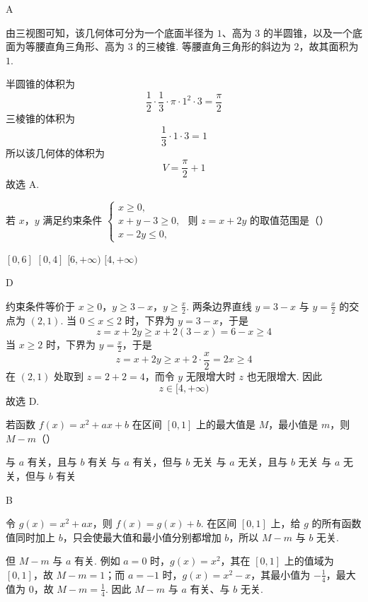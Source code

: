 \begin{answer}
A
\end{answer}

\begin{solution}
由三视图可知，该几何体可分为一个底面半径为 \(1\)、高为 \(3\) 的半圆锥，以及一个底面为等腰直角三角形、高为 \(3\) 的三棱锥. 等腰直角三角形的斜边为 \(2\)，故其面积为 \(1\).

半圆锥的体积为
\[
\frac12\cdot\frac13\cdot\pi\cdot1^2\cdot3=\frac{\pi}{2}
\]
三棱锥的体积为
\[
\frac13\cdot1\cdot3=1
\]
所以该几何体的体积为
\[
V=\frac{\pi}{2}+1
\]
故选 A.
\end{solution}

\begin{problem}
若 \(x\)，\(y\) 满足约束条件
\(\begin{cases}
x\ge0,\\
x+y-3\ge0,\\
x-2y\le0,
\end{cases}\)
则 \(z=x+2y\) 的取值范围是（\quad）

\choices
    {\([0,6]\)}
    {\([0,4]\)}
    {\([6,+\infty)\)}
    {\([4,+\infty)\)}
\end{problem}

\begin{answer}
D
\end{answer}

\begin{solution}
约束条件等价于
\(x\geq0\)，\(y\geq3-x\)，\(y\geq\frac{x}{2}\).
两条边界直线 \(y=3-x\) 与 \(y=\frac{x}{2}\) 的交点为 \((2,1)\). 当 \(0\leq x\leq2\) 时，下界为 \(y=3-x\)，于是
\[
z=x+2y\geq x+2(3-x)=6-x\geq4
\]
当 \(x\geq2\) 时，下界为 \(y=\frac{x}{2}\)，于是
\[
z=x+2y\geq x+2\cdot\frac{x}{2}=2x\geq4
\]
在 \((2,1)\) 处取到 \(z=2+2=4\)，而令 \(y\) 无限增大时 \(z\) 也无限增大. 因此
\[
z\in[4,+\infty)
\]
故选 D.
\end{solution}

\begin{problem}
若函数 \(f(x)=x^{2}+ax+b\) 在区间 \([0,1]\) 上的最大值是 \(M\)，最小值是 \(m\)，则 \(M-m\)（\quad）

\choices
    {与 \(a\) 有关，且与 \(b\) 有关}
    {与 \(a\) 有关，但与 \(b\) 无关}
    {与 \(a\) 无关，且与 \(b\) 无关}
    {与 \(a\) 无关，但与 \(b\) 有关}
\end{problem}

\begin{answer}
B
\end{answer}

\begin{solution}
令 \(g(x)=x^2+ax\)，则 \(f(x)=g(x)+b\). 在区间 \([0,1]\) 上，给 \(g\) 的所有函数值同时加上 \(b\)，只会使最大值和最小值分别都增加 \(b\)，所以 \(M-m\) 与 \(b\) 无关.

但 \(M-m\) 与 \(a\) 有关. 例如 \(a=0\) 时，\(g(x)=x^2\)，其在 \([0,1]\) 上的值域为 \([0,1]\)，故 \(M-m=1\)；而 \(a=-1\) 时，\(g(x)=x^2-x\)，其最小值为 \(-\frac{1}{4}\)，最大值为 \(0\)，故 \(M-m=\frac{1}{4}\). 因此 \(M-m\) 与 \(a\) 有关、与 \(b\) 无关.
\end{solution}

